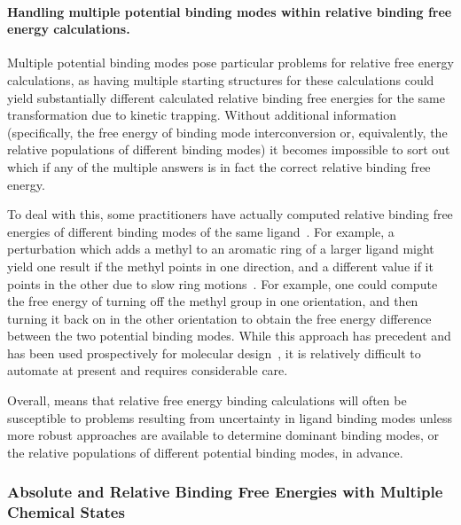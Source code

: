 \documentclass[9pt,bestpractices]{livecoms}
\begin{document}
\paragraph{Handling multiple potential binding modes within relative binding free energy calculations.}
Multiple potential binding modes pose particular problems for relative free energy calculations, as having multiple starting structures for these calculations could yield substantially different calculated relative binding free energies for the same transformation due to kinetic trapping. Without additional information (specifically, the free energy of binding mode interconversion or, equivalently, the relative populations of different binding modes) it becomes impossible to sort out which if any of the multiple answers is in fact the correct relative binding free energy.

To deal with this, some practitioners have actually computed relative binding free energies of different binding modes of the same ligand~\cite{palma2012computation}.
For example, a perturbation which adds a methyl to an aromatic ring of a larger ligand might yield one result if the methyl points in one direction, and a different value if it points in the other due to slow ring motions~\cite{lincoff2016comparing, sasmal2020sampling}.
For example, one could compute the free energy of turning off the methyl group in one orientation, and then turning it back on in the other orientation to obtain the free energy difference between the two potential binding modes.
While this approach has precedent and has been used prospectively for molecular design~\cite{desimone2019}, it is relatively difficult to automate at present and requires considerable care.

Overall, means that relative free energy binding calculations will often be susceptible to problems resulting from uncertainty in ligand binding modes unless more robust approaches are available to determine dominant binding modes, or the relative populations of different potential binding modes, in advance.

\subsubsection{Absolute and Relative Binding Free Energies with Multiple Chemical States}
\label{sec:multiple-chemical-states}
\end{document}
